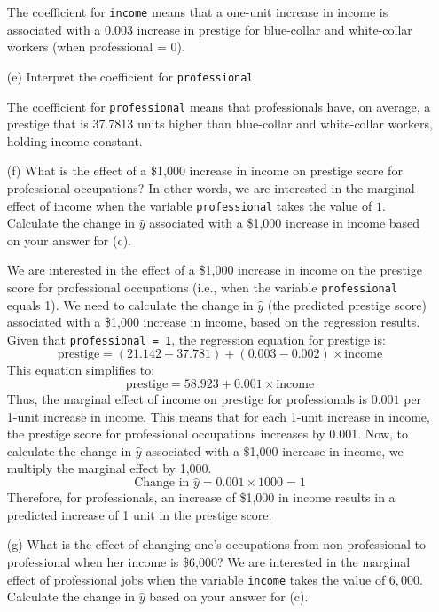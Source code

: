 \documentclass[12pt,letterpaper]{article}
\begin{document}
\begin{enumerate}
	The coefficient for  \texttt{income} means that a one-unit increase in income is associated with a 0.003 increase in prestige for blue-collar and white-collar workers (when professional = 0).
	
	\vspace{0.5cm}	
	\item [(e)]
	Interpret the coefficient for \texttt{professional}.
	\vspace{0.2cm}	
	
	The coefficient for \texttt{professional} means that professionals have, on average, a prestige that is 37.7813 units higher than blue-collar and white-collar workers, holding income constant.

	\vspace{0.5cm}	
	\item [(f)]
	What is the effect of a \$1,000 increase in income on prestige score for professional occupations? In other words, we are interested in the marginal effect of income when the variable \texttt{professional} takes the value of $1$. Calculate the change in $\hat{y}$ associated with a \$1,000 increase in income based on your answer for (c).
	\vspace{0.2cm}	
	
	We are interested in the effect of a \$1,000 increase in income on the prestige score for professional occupations (i.e., when the variable \texttt{professional} equals 1). We need to calculate the change in \( \hat{y} \) (the predicted prestige score) associated with a \$1,000 increase in income, based on the regression results.
	Given that \texttt{professional = 1}, the regression equation for prestige is:
	\[
	\text{prestige} = (21.142 + 37.781) + (0.003 - 0.002) \times \text{income}
	\]
	This equation simplifies to:
	\[
	\text{prestige} = 58.923 + 0.001 \times \text{income}
	\]
	Thus, the marginal effect of income on prestige for professionals is \( 0.001 \) per 1-unit increase in income. This means that for each 1-unit increase in income, the prestige score for professional occupations increases by 0.001.
	Now, to calculate the change in \( \hat{y} \) associated with a \$1,000 increase in income, we multiply the marginal effect by 1,000.
	\[
	\text{Change in } \hat{y} = 0.001 \times 1000 = 1
	\]
	Therefore, for professionals, an increase of \$1,000 in income results in a predicted increase of 1 unit in the prestige score.
	
	
	\vspace{0.5cm}
	
	
	\item [(g)]
	What is the effect of changing one's occupations from non-professional to professional when her income is \$6,000? We are interested in the marginal effect of professional jobs when the variable \texttt{income} takes the value of $6,000$. Calculate the change in $\hat{y}$ based on your answer for (c).
	

\end{enumerate}
\end{document}
